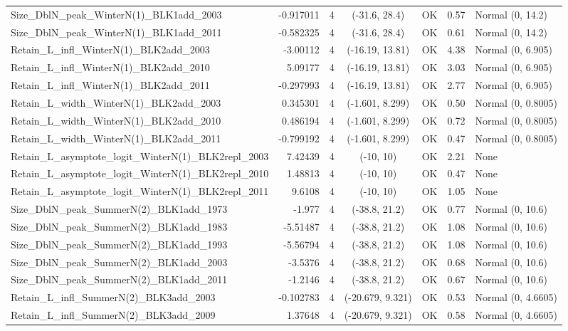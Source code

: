 \documentclass[12pt,]{article}
\begin{document}
\begin{landscape}
\begin{longtable}{lrcccll}
  Size\_DblN\_peak\_WinterN(1)\_BLK1add\_2003 & -0.917011 & 4 & (-31.6, 28.4) & OK & 0.57 & Normal (0, 14.2) \\ 
  Size\_DblN\_peak\_WinterN(1)\_BLK1add\_2011 & -0.582325 & 4 & (-31.6, 28.4) & OK & 0.61 & Normal (0, 14.2) \\ 
  Retain\_L\_infl\_WinterN(1)\_BLK2add\_2003 & -3.00112 & 4 & (-16.19, 13.81) & OK & 4.38 & Normal (0, 6.905) \\ 
  Retain\_L\_infl\_WinterN(1)\_BLK2add\_2010 & 5.09177 & 4 & (-16.19, 13.81) & OK & 3.03 & Normal (0, 6.905) \\ 
  Retain\_L\_infl\_WinterN(1)\_BLK2add\_2011 & -0.297993 & 4 & (-16.19, 13.81) & OK & 2.77 & Normal (0, 6.905) \\ 
  Retain\_L\_width\_WinterN(1)\_BLK2add\_2003 & 0.345301 & 4 & (-1.601, 8.299) & OK & 0.50 & Normal (0, 0.8005) \\ 
  Retain\_L\_width\_WinterN(1)\_BLK2add\_2010 & 0.486194 & 4 & (-1.601, 8.299) & OK & 0.72 & Normal (0, 0.8005) \\ 
  Retain\_L\_width\_WinterN(1)\_BLK2add\_2011 & -0.799192 & 4 & (-1.601, 8.299) & OK & 0.47 & Normal (0, 0.8005) \\ 
  Retain\_L\_asymptote\_logit\_WinterN(1)\_BLK2repl\_2003 & 7.42439 & 4 & (-10, 10) & OK & 2.21 & None \\ 
  Retain\_L\_asymptote\_logit\_WinterN(1)\_BLK2repl\_2010 & 1.48813 & 4 & (-10, 10) & OK & 0.47 & None \\ 
  Retain\_L\_asymptote\_logit\_WinterN(1)\_BLK2repl\_2011 & 9.6108 & 4 & (-10, 10) & OK & 1.05 & None \\ 
  Size\_DblN\_peak\_SummerN(2)\_BLK1add\_1973 & -1.977 & 4 & (-38.8, 21.2) & OK & 0.77 & Normal (0, 10.6) \\ 
  Size\_DblN\_peak\_SummerN(2)\_BLK1add\_1983 & -5.51487 & 4 & (-38.8, 21.2) & OK & 1.08 & Normal (0, 10.6) \\ 
  Size\_DblN\_peak\_SummerN(2)\_BLK1add\_1993 & -5.56794 & 4 & (-38.8, 21.2) & OK & 1.08 & Normal (0, 10.6) \\ 
  Size\_DblN\_peak\_SummerN(2)\_BLK1add\_2003 & -3.5376 & 4 & (-38.8, 21.2) & OK & 0.68 & Normal (0, 10.6) \\ 
  Size\_DblN\_peak\_SummerN(2)\_BLK1add\_2011 & -1.2146 & 4 & (-38.8, 21.2) & OK & 0.67 & Normal (0, 10.6) \\ 
  Retain\_L\_infl\_SummerN(2)\_BLK3add\_2003 & -0.102783 & 4 & (-20.679, 9.321) & OK & 0.53 & Normal (0, 4.6605) \\ 
  Retain\_L\_infl\_SummerN(2)\_BLK3add\_2009 & 1.37648 & 4 & (-20.679, 9.321) & OK & 0.58 & Normal (0, 4.6605) \\ 

\end{longtable}
\end{landscape}
\end{document}
